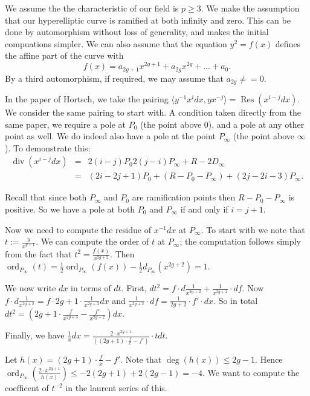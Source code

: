 \documentclass[draft, 11pt]{article} %
\title{}
\author{}
\theoremstyle{plain}
\theoremstyle{remark}
\DeclareMathOperator{\res}{Res}
\DeclareMathOperator{\ord}{ord}
\DeclareMathOperator{\di}{div}
\begin{document}
\maketitle


We assume the the characteristic of our field is $p\geq 3$.
We make the assumption that our hyperelliptic curve is ramified at both infinity and zero.
This can be done by automorphism without loss of generality, and makes the initial compuations simpler.
We can also assume that the equation $y^2 = f(x)$ defines the affine part of the curve with \[
f(x) = a_{2g+1}x^{2g+1} + a_{2g}x^{2g} +\ldots + a_0.
\]
By a third automorphism, if required, we may assume that $a_{2g} \neq =0$.


In the paper of Hortsch, we take the pairing $\langle y^{-1}x^idx, yx^{-j} \rangle = \res(x^{i-j}dx)$.
We consider the same pairing to start with.
A condition taken directly from the same paper, we require a pole at $P_0$ (the point above 0), and a pole at any other point as well.
We do indeed also have a pole at the point $P_\infty$ (the point above $\infty$).
To demonstrate this:
\begin{eqnarray}
	\di(x^{i-j}dx) & = &  2(i-j)P_0  2(j-i)P_\infty + R - 2D_\infty \\
	& = & (2i-2j+1)P_0 +(R-P_0-P_\infty) +(2j-2i-3)P_\infty.
\end{eqnarray}

Recall that since both $P_\infty$ and $P_0$ are ramification points then $R-P_0-P_\infty$ is positive.
So we have a pole at both $P_0$ and $P_\infty$ if and only if $i=j+1$.

Now we need to compute the residue of $x^{-1}dx$ at $P_\infty$.
To start with we note that $t:= \frac{y}{x^{g+1}}$.
We can compute the order of $t$ at $P_\infty$; the computation follows simply from the fact that $t^2 = \frac{f(x)}{x^{2g+2}}$.
Then $\ord_{P_\infty}(t) = \frac{1}{2}\ord_{P_\infty}(f(x)) - \frac{1}{2}d_{P_\infty}(x^{2g+2}) = 1$.

We now write $dx$ in terms of $dt$.
First, $dt^2 = f\cdot d\frac{1}{x^{2g+2}} + \frac{1}{x^{2g+2}} \cdot df$.
Now $f\cdot d\frac{1}{x^{2g+2}} = f\cdot 2g+1 \cdot \frac{1}{x^{2g+3}} dx$ and $\frac{1}{x^{2g+2}} \cdot df = \frac{1}{2g+2}\cdot f' \cdot dx$.
So in total $dt^2 = \left (2g+1 \cdot \frac{f}{x^{2g+3}} - \frac{f'}{x^{2g+2}} \right ) dx$.

Finally, we have $\frac{1}{x}dx = \frac {2\cdot x^{2g+1}}{\left ( (2g+1)\cdot \frac{f}{x} - f' \right )} \cdot t dt$.

Let $h(x) = (2g+1)\cdot \frac{f}{x} - f'$.
Note that $\deg(h(x)) \leq 2g-1$.
Hence $\ord_{P_\infty}\left ( \frac{2\cdot x^{2g+1}}{h(x)} \right ) \leq -2(2g+1) + 2(2g-1) = -4$.
We want to compute the coefficent of $t^{-2}$ in the laurent series of this.
\end{document}
